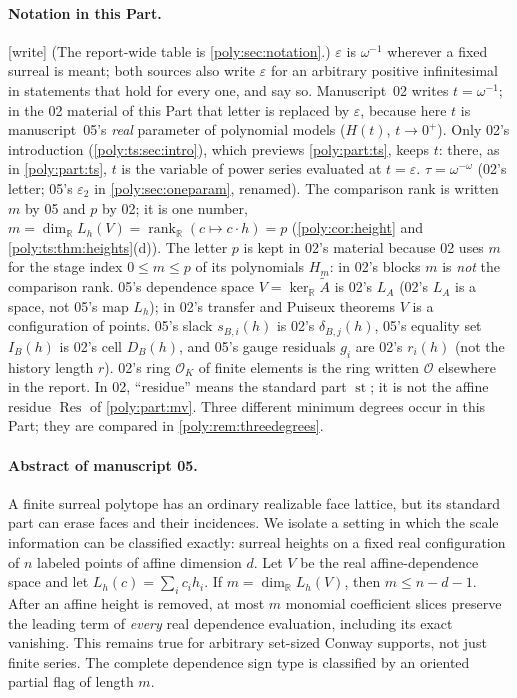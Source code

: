 \documentclass[11pt,a4paper]{article}
\numberwithin{equation}{section}
\theoremstyle{plain}
\newcommand{\wtag}{\textup{[write]}}%
\newcommand{\R}{\mathbb R}
\newcommand{\eps}{\varepsilon}
\newcommand{\st}{\operatorname{st}}
\newcommand{\rank}{\operatorname{rank}}
\newcommand{\Atil}{\widetilde A}
\newcommand{\cO}{\mathcal{O}}
\newcommand{\OO}{\mathcal O}
\newcommand{\Res}{\operatorname{Res}}
\begin{document}
\paragraph{Notation in this Part.} \wtag{} (The report-wide table is
\cref{poly:sec:notation}.) $\eps$ is $\omega^{-1}$ wherever a fixed surreal
is meant; both sources also write $\eps$ for an arbitrary positive
infinitesimal in statements that hold for every one, and say so.
Manuscript~02 writes $t=\omega^{-1}$; in the 02 material of this Part that
letter is replaced by $\eps$, because here $t$ is manuscript~05's
\emph{real} parameter of polynomial models ($H(t)$, $t\to0^+$). Only 02's
introduction (\cref{poly:ts:sec:intro}), which previews \cref{poly:part:ts},
keeps $t$: there, as in \cref{poly:part:ts}, $t$ is the variable of power
series evaluated at $t=\eps$. $\tau=\omega^{-\omega}$ (02's letter; 05's
$\eps_2$ in \cref{poly:sec:oneparam}, renamed). The comparison rank is
written $m$ by 05 and $p$ by 02; it is one number,
$m=\dim_\R L_h(V)=\rank_\R(c\mapsto c\cdot h)=p$
(\cref{poly:cor:height} and \cref{poly:ts:thm:heights}(d)). The letter $p$
is kept in 02's material because 02 uses $m$ for the stage index
$0\le m\le p$ of its polynomials $H_m$: in 02's blocks $m$ is \emph{not}
the comparison rank. 05's dependence space $V=\ker_\R\Atil$ is 02's
$L_A$ (02's $L_A$ is a space, not 05's map $L_h$); in 02's transfer and
Puiseux theorems $V$ is a configuration of points. 05's slack
$s_{B,i}(h)$ is 02's $\delta_{B,j}(h)$, 05's equality set $I_B(h)$ is 02's
cell $D_B(h)$, and 05's gauge residuals $g_i$ are 02's $r_i(h)$ (not the
history length $r$). 02's ring $\cO_K$ of finite elements is the ring written
$\OO$ elsewhere in the report. In 02, ``residue'' means the standard part
$\st$; it is not the affine residue $\Res$ of \cref{poly:part:mv}. Three
different minimum degrees occur in this Part; they are compared in
\cref{poly:rem:threedegrees}.

\paragraph{Abstract of manuscript 05.}
A finite surreal polytope has an ordinary realizable face lattice, but its
standard part can erase faces and their incidences. We isolate a setting in
which the scale information can be classified exactly: surreal heights on a
fixed real configuration of $n$ labeled points of affine dimension $d$.
Let $V$ be the real affine-dependence space and let
$L_h(c)=\sum_i c_i h_i$. If $m=\dim_{\R}L_h(V)$, then
$m\le n-d-1$. After an affine height is removed, at most $m$ monomial
coefficient slices preserve the leading term of \emph{every} real dependence
evaluation, including its exact vanishing. This remains true for arbitrary
set-sized Conway supports, not just finite series. The complete dependence
sign type is classified by an oriented partial flag of length $m$.
\end{document}

